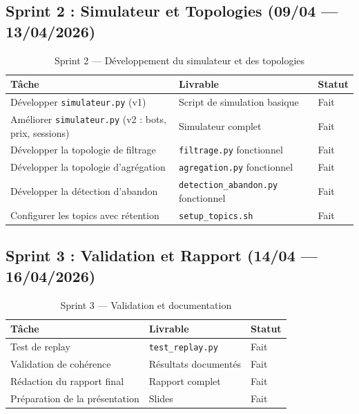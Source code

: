 \subsection{Sprint 2 : Simulateur et Topologies (09/04 --- 13/04/2026)}

\begin{table}[H]
\centering
\begin{tabularx}{\textwidth}{X L{5cm} C{2cm}}
\toprule
\textbf{\color{primarycolor}Tâche} &
\textbf{\color{primarycolor}Livrable} &
\textbf{\color{primarycolor}Statut} \\
\midrule
Développer \texttt{simulateur.py} (v1) & Script de simulation basique & Fait \\
Améliorer \texttt{simulateur.py} (v2 : bots, prix, sessions) & Simulateur complet & Fait \\
Développer la topologie de filtrage & \texttt{filtrage.py} fonctionnel & Fait \\
Développer la topologie d'agrégation & \texttt{agregation.py} fonctionnel & Fait \\
Développer la détection d'abandon & \texttt{detection\_abandon.py} fonctionnel & Fait \\
Configurer les topics avec rétention & \texttt{setup\_topics.sh} & Fait \\
\bottomrule
\end{tabularx}
\caption{Sprint 2 --- Développement du simulateur et des topologies}
\end{table}

\subsection{Sprint 3 : Validation et Rapport (14/04 --- 16/04/2026)}

\begin{table}[H]
\centering
\begin{tabularx}{\textwidth}{X L{5cm} C{2cm}}
\toprule
\textbf{\color{primarycolor}Tâche} &
\textbf{\color{primarycolor}Livrable} &
\textbf{\color{primarycolor}Statut} \\
\midrule
Test de replay & \texttt{test\_replay.py} & Fait \\
Validation de cohérence & Résultats documentés & Fait \\
Rédaction du rapport final & Rapport complet & Fait \\
Préparation de la présentation & Slides & Fait \\
\bottomrule
\end{tabularx}
\caption{Sprint 3 --- Validation et documentation}
\end{table}

